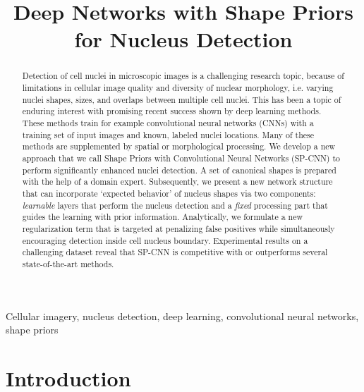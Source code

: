 \documentclass{article}
\title{Deep Networks with Shape Priors for Nucleus Detection\vspace{-5pt}}
\begin{document}
\maketitle
\begin{abstract}
	\emergencystretch=10pt
Detection of cell nuclei in microscopic images is a challenging research topic, because of limitations in cellular image quality and diversity of nuclear morphology, i.e. varying nuclei shapes, sizes, and overlaps between multiple cell nuclei. This has been a topic of enduring interest with promising recent success shown by deep learning methods. These methods train for example convolutional neural networks (CNNs) with a training set of input images and known, labeled nuclei locations. Many of these methods are supplemented by spatial or morphological processing. We develop a new approach that we call Shape Priors with Convolutional Neural Networks (SP-CNN) to perform significantly enhanced nuclei detection. A set of canonical shapes is prepared with the help of a domain expert. Subsequently, we present a new network structure that can incorporate `expected behavior' of nucleus shapes via two components: {\em learnable} layers that perform the nucleus detection and a {\em fixed} processing part that guides the learning with prior information. Analytically, we formulate a new regularization term that is targeted at penalizing false positives while simultaneously encouraging detection inside cell nucleus boundary. Experimental results on a challenging dataset reveal that SP-CNN is competitive with or outperforms several state-of-the-art methods.\vspace{-5pt}
\end{abstract}
\begin{keywords}
	Cellular imagery, nucleus detection, deep learning, convolutional neural networks, shape priors\vspace{-5pt}
\end{keywords}
\section{Introduction}\vspace{-5pt}
\label{sec:intro}
\end{document}

